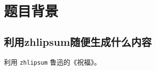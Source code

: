 \section{题目背景}
\subsection{利用zhlipsum随便生成什么内容}
利用 \verb|zhlipsum| 鲁迅的《祝福》。

\zhlipsum[1-20][name = zhufu]
